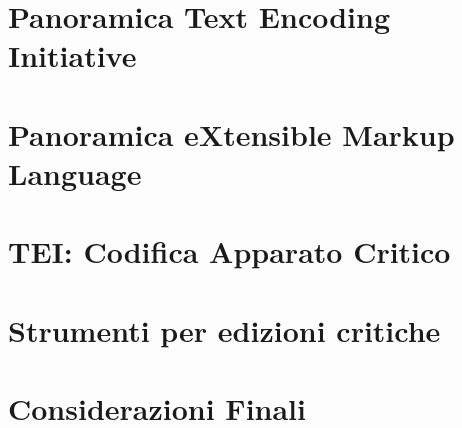 \documentclass{beamer}
\begin{document}


\section{Panoramica Text Encoding Initiative}


\section{Panoramica eXtensible Markup Language}


\section{TEI: Codifica Apparato Critico}


\section{Strumenti per edizioni critiche}


\section{Considerazioni Finali}


%
\end{document}
